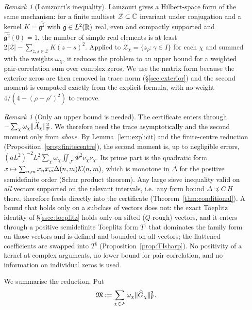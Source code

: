 \documentclass[11pt]{amsart}
\theoremstyle{definition}
\theoremstyle{remark}
\newtheorem{remark}[theorem]{Remark}
\numberwithin{equation}{section}
\begin{document}
\begin{remark}[Lamzouri's inequality]
Lamzouri \cite[Prop.~2.1]{Lam26} gives a Hilbert-space form of the same mechanism: for a finite multiset $\mathcal Z\subset\mathbb C$ invariant under conjugation and a kernel $K=\widehat{\mathfrak g^2}$ with $\mathfrak g\in L^2(\mathbb R)$ real, even and compactly supported and $\widehat{\mathfrak g^2}(0)=1$, the number of simple real elements is at least $2|\mathcal Z|-\sum_{z,s\in\mathcal Z}K(z-s)^2$. Applied to $\mathcal Z_\chi=\{z_\rho:\gamma\in I\}$ for each $\chi$ and summed with the weights $\omega_\chi$, it reduces the problem to an upper bound for a weighted pair-correlation sum over complex zeros. We use the matrix form because the exterior zeros are then removed in trace norm (\S\ref{sec:exterior}) and the second moment is computed exactly from the explicit formula, with no weight $4/(4-(\rho-\rho')^2)$ to remove.
\end{remark}

\begin{remark}[Only an upper bound is needed]\label{rem:upper}
The certificate enters through $-\sum_\chi\omega_\chi\|\widehat A_\chi\|_\mathrm F^2$. We therefore need the trace asymptotically and the second moment only from \emph{above}. By Lemma~\ref{lem:explicit} and the finite-centre reduction (Proposition~\ref{prop:finitecentre}), the second moment is, up to negligible errors, $(aL^2)^{-2}L^2\sum_\chi\omega_\chi\iint_{J^2}\Phi^2\nu_\chi\nu_\chi$. Its prime part is the quadratic form $x\mapsto\sum_{n,m}x_n\overline{x_m}\Delta(n,m)\mathcal K(n,m)$, which is monotone in $\Delta$ for the positive semidefinite order (Schur product theorem). Any large sieve inequality valid on \emph{all} vectors supported on the relevant intervals, i.e.\ any form bound $\Delta\preceq C\,H$ there, therefore feeds directly into the certificate (Theorem~\ref{thm:conditional}). A bound that holds only on a subclass of vectors does not: the exact Toeplitz identity of \S\ref{ssec:toeplitz} holds only on sifted ($Q$-rough) vectors, and it enters through a positive semidefinite Toeplitz form $T^\natural$ that dominates the family form on those vectors and is defined and bounded on all vectors; the flattened coefficients are swapped into $T^\natural$ (Proposition~\ref{prop:TIsharp}). No positivity of a kernel at complex arguments, no lower bound for pair correlation, and no information on individual zeros is used.
\end{remark}

We summarise the reduction. Put
\begin{equation}\label{eq:Mfrak}
\mathfrak M:=\sum_{\chi\in\mathcal F}\omega_\chi\|\widehat G_\chi\|_\mathrm F^2 .
\end{equation}
\end{document}
